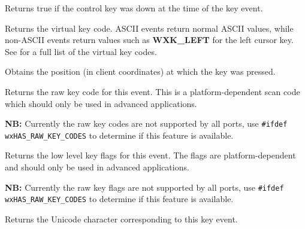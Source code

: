 \label{wxkeyeventcontroldown}


Returns true if the control key was down at the time of the key event.


\label{wxkeyeventgetkeycode}


Returns the virtual key code. ASCII events return normal ASCII values,
while non-ASCII events return values such as {\bf WXK\_LEFT} for the
left cursor key. See  for a full list of the virtual key codes.


\label{wxkeyeventgetposition}



Obtains the position (in client coordinates) at which the key was pressed.


\label{wxkeyeventgetrawkeycode}


Returns the raw key code for this event. This is a platform-dependent scan code
which should only be used in advanced applications.

{\bf NB:} Currently the raw key codes are not supported by all ports, use
{\tt\#ifdef wxHAS\_RAW\_KEY\_CODES} to determine if this feature is available.


\label{wxkeyeventgetrawkeyflags}


Returns the low level key flags for this event. The flags are
platform-dependent and should only be used in advanced applications.

{\bf NB:} Currently the raw key flags are not supported by all ports, use
{\tt \#ifdef wxHAS\_RAW\_KEY\_CODES} to determine if this feature is available.


\label{wxkeyeventgetunicodekey}


Returns the Unicode character corresponding to this key event.

